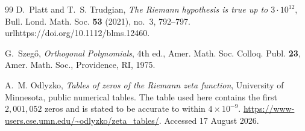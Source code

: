 \documentclass[pdflatex,sn-mathphys-num]{sn-jnl}
\numberwithin{equation}{section}
\theoremstyle{thmstyleone}
\theoremstyle{thmstylethree}
\theoremstyle{thmstyletwo}
\newcommand{\1}{\mathbf 1}
\begin{document}
\begin{thebibliography}{99}
D.~Platt and T.~S. Trudgian,
\textit{The Riemann hypothesis is true up to $3\cdot10^{12}$},
Bull. Lond. Math. Soc. \textbf{53} (2021), no.~3, 792--797.
\\url{https://doi.org/10.1112/blms.12460}.

G.~Szeg\H{o},
\textit{Orthogonal Polynomials},
4th ed., Amer. Math. Soc. Colloq. Publ. \textbf{23},
Amer. Math. Soc., Providence, RI, 1975.


A.~M. Odlyzko,
\textit{Tables of zeros of the Riemann zeta function},
University of Minnesota, public numerical tables.
The table used here contains the first \(2{,}001{,}052\) zeros and is stated
to be accurate to within \(4\times10^{-9}\).
\url{https://www-users.cse.umn.edu/~odlyzko/zeta_tables/}.
Accessed 17 August 2026.

\end{thebibliography}
\end{document}
